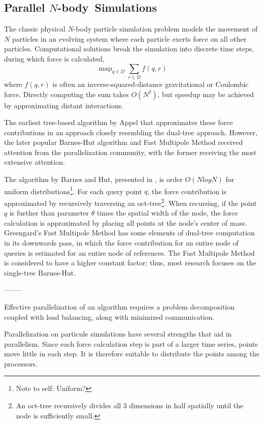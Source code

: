 \documentclass[times, leqno,twocolumn]{article}
\newcommand{\authornote}[1]{\footnote{Note to self: #1}}
\DeclareMathOperator*{\map}{map}
\newcommand{\nbody}{$N$-body}
\begin{document}
\subsection{Parallel \nbody\ Simulations}

The classic physical $N$-body particle simulation problem models the movement of $N$ particles in an evolving system where each particle exerts force on all other particles.
Computational solutions break the simulation into discrete time steps, during which force is calculated,
\[\map_{q \in D} \sum_{r \in D} f(q,r)\]
\noindent where $f(q,r)$ is often an inverse-squared-distance gravitational or Coulombic force.
Directly computing the sum takes $O(N^2)$, but speedup may be achieved by approximating distant interactions.

The earliest tree-based algorithm by Appel \cite{appel} that approximates these force contributions in an approach closely resembling the dual-tree approach.
However, the later popular Barnes-Hut algorithm\cite{barneshut} and Fast Multipole Method\cite{greengard_fmm} received attention from the parallelization community, with the former receiving the most extensive attention.



The algorithm by Barnes and Hut, presented in \cite{barneshut}, is order $O(N log N)$ for uniform distributions\authornote{Uniform?}.
For each query point $q$, the force contribution is approximated by recursively traversing an oct-tree\footnote{An oct-tree recursively divides all 3 dimensions in half spatially until the node is sufficiently small.}.
When recursing, if the point $q$ is further than parameter $\theta$ times the spatial width of the node, the force calculation is approximated by placing all points at the node's center of mass.
Greengard's Fast Multipole Method \cite{greengard_fmm} has some elements of dual-tree computation in its downwards pass, in which the force contribution for an entire node of queries is estimated for an entire node of references.
The Fast Multipole Method is considered to have a higher constant factor; thus, most research focuses on the single-tree Barnes-Hut\cite{fmm_slower}.

--------

Effective parallelization of an algorithm requires a problem decomposition coupled with load balancing, along with minimized communication.

Parallelization on particule simulations have several strengths that aid in parallelism.
Since each force calculation step is part of a larger time series, points move little in each step.
It is therefore suitable to distribute the points among the processors.
\end{document}

